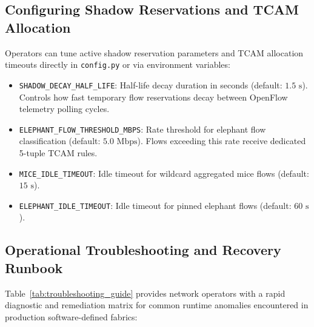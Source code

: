 \documentclass[12pt,a4paper,oneside]{report}
\begin{document}
\subsection{Configuring Shadow Reservations and TCAM Allocation}
Operators can tune active shadow reservation parameters and TCAM allocation timeouts directly in \texttt{config.py} or via environment variables:
\begin{itemize}
    \item \texttt{SHADOW\_DECAY\_HALF\_LIFE}: Half-life decay duration in seconds (default: $1.5\text{ s}$). Controls how fast temporary flow reservations decay between OpenFlow telemetry polling cycles.
    \item \texttt{ELEPHANT\_FLOW\_THRESHOLD\_MBPS}: Rate threshold for elephant flow classification (default: $5.0\text{ Mbps}$). Flows exceeding this rate receive dedicated 5-tuple TCAM rules.
    \item \texttt{MICE\_IDLE\_TIMEOUT}: Idle timeout for wildcard aggregated mice flows (default: $15\text{ s}$).
    \item \texttt{ELEPHANT\_IDLE\_TIMEOUT}: Idle timeout for pinned elephant flows (default: $60\text{ s}$).
\end{itemize}

\clearpage
\subsection{Operational Troubleshooting and Recovery Runbook}
Table~\ref{tab:troubleshooting_guide} provides network operators with a rapid diagnostic and remediation matrix for common runtime anomalies encountered in production software-defined fabrics:
\end{document}
